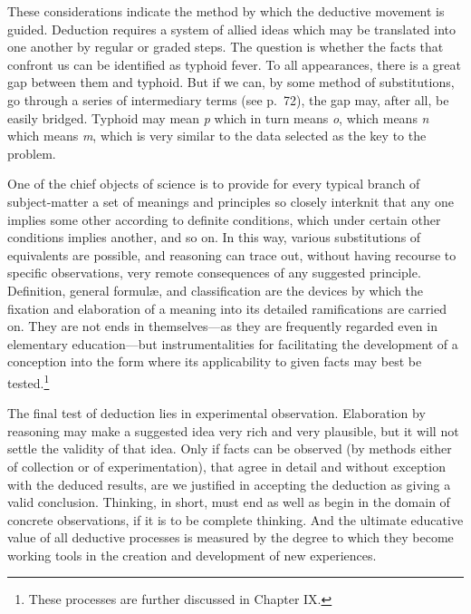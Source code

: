 \documentclass[showtrims,ustradepaper]{memoir}
\begin{document}

These considerations indicate the method by which the deductive movement
is guided. Deduction requires a system of allied ideas which may be
translated into one another by regular or graded steps. The question is
whether the facts that confront us can be identified as typhoid fever.
To all appearances, there is a great gap between them and typhoid. But
if we can, by some method of substitutions, go through a series of
intermediary terms (see p.\ 72), the gap may, after all, be easily
bridged. Typhoid may mean \emph{p} which in turn means \emph{o}, which
means \emph{n} which means \emph{m}, which is very similar to the data
selected as the key to the problem.


One of the chief objects of science is to provide for every typical
branch of subject-matter a set of meanings and principles so closely
interknit that any one implies some other according to definite
conditions, which under certain other conditions implies another, and so
on. In this way, various substitutions of equivalents are possible, and
reasoning can trace out, without having recourse to specific
observations, very remote consequences of any suggested principle.
Definition, general formulæ, and classification are the devices by which
the fixation and elaboration of a meaning into its detailed
ramifications are carried on. They are not ends in themselves---as they
are frequently regarded even in elementary education---but
instrumentalities for
facilitating
the development of a conception into the form where its applicability to
given facts may best be
tested.\footnote{These processes are further discussed in Chapter IX.}


The final test of deduction lies in experimental observation.
Elaboration by reasoning may make a suggested idea very rich and very
plausible, but it will not settle the validity of that idea. Only if
facts can be observed (by methods either of collection or of
experimentation), that agree in detail and without exception with the
deduced results, are we justified in accepting the deduction as giving a
valid conclusion. Thinking, in short, must end as well as begin in the
domain of concrete observations, if it is to be complete thinking. And
the ultimate educative value of all deductive processes is measured by
the degree to which they become working tools in the creation and
development of new experiences.
\end{document}
